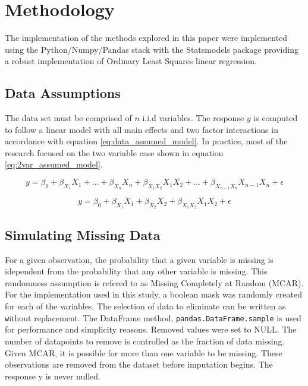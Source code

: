 \documentclass[../paper.tex]{subfiles}
\begin{document}
\section{Methodology}
The implementation of the methods explored in this paper were implemented using
the Python/Numpy/Pandas stack with the Statsmodels package providing a robust
implementation of Ordinary Least Squares linear regression.


\subsection{Data Assumptions}
The data set must be comprised of $n$ i.i.d variables. The response $y$ is computed
to follow a linear model with all main effects and two factor interactions
in accordance with equation \ref{eq:data_assumed_model}. In practice, most of
the research focused on the two variable case shown in equation \ref{eq:2var_assumed_model}.

\begin{equation}\label{eq:data_assumed_model}
y = \beta_{0} + \beta_{ X_{1} } X_{1}  + \ldots + \beta_{X_{n}}X_{n} +
\beta_{X_{1}X_{2}}X_{1}X_{2} + \ldots +\beta_{X_{n-1}X_{n}}X_{n-1}X_{n} + \epsilon
\end{equation}


\begin{equation}\label{eq:2var_assumed_model}
y = \beta_{0} + \beta_{ X_{1}} X_{1} + \beta_{X_{2} }X_{2} + \beta_{ X_{1} X_{2} } X_{1}X_{2} + \epsilon
\end{equation}


\subsection{Simulating Missing Data}
For a given observation, the probability that a given variable is missing is
idependent from the probability that any other variable is missing. This randomness
assumption is refered to as Missing Completely at Random (MCAR). For the implementation
used in this study, a boolean mask was randomly created for each
of the variables. The selection of data to eliminate can be written as
\texttt without replacement.
The DataFrame method, \texttt{pandas.DataFrame.sample} is used for
performance and simplicity reasons. Removed values were set to NULL. The number of
datapoints to remove is controlled as the fraction of data missing. Given MCAR,
it is possible for more than one variable to be missing. These observations are
removed from the dataset before imputation begins. The response y is never
nulled.
\end{document}
